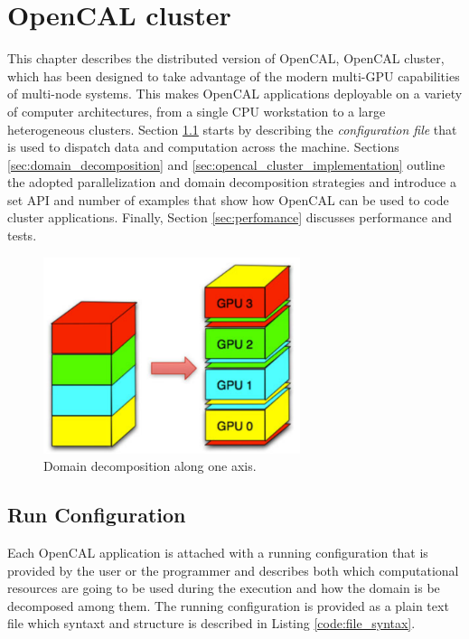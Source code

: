 \section{OpenCAL cluster}
This chapter describes the distributed version of OpenCAL, OpenCAL cluster, which has been designed to take advantage of the modern multi-GPU capabilities of multi-node systems. This makes OpenCAL applications deployable on a variety of computer architectures, from a single CPU workstation to a large heterogeneous clusters. 
Section \ref{sec:run_configuration} starts by describing the \textit{configuration file} that is used to dispatch data and computation across the machine. Sections 
\ref{sec:domain_decomposition} and \ref{sec:opencal_cluster_implementation}  outline the adopted parallelization and domain decomposition strategies and introduce a set API and number of examples that show how OpenCAL can be used to code cluster applications. Finally, Section \ref{sec:perfomance} discusses performance and tests.
  \begin{figure}
	\begin{center}
		\includegraphics[width=0.67\textwidth]{./images/opencal/multigpu_domain_decomposition.png}
		\caption{Domain decomposition along one axis.}
		\label{fig:multigpu_domain_decomposition}
	\end{center}
\end{figure}



\subsection{Run Configuration}
\label{sec:run_configuration}
Each OpenCAL application is attached with a running configuration that is provided by the user or the programmer and describes both which computational resources are going to be used during the execution and how the domain is be decomposed among them.
The running configuration is provided as a plain text file which syntaxt and structure is described in Listing \ref{code:file_syntax}.


